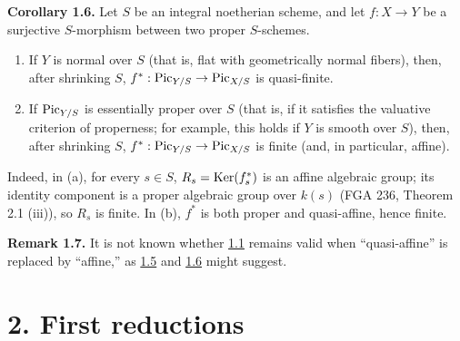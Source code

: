 \textbf{Corollary 1.6.} Let $S$ be an integral noetherian scheme, and let
$f:X\to Y$ be a surjective $S$-morphism between two proper $S$-schemes.
\begin{enumerate}[label=\alph*)]
\item If $Y$ is normal over $S$ (that is, flat with geometrically normal
  fibers), then, after shrinking $S$,
  $f^*:\operatorname{Pic}_{Y/S}\to\operatorname{Pic}_{X/S}$ is quasi-finite.
\item If $\operatorname{Pic}_{Y/S}$ is essentially proper over $S$ (that is, if it
  satisfies the valuative criterion of properness; for example, this holds
  if $Y$ is smooth over $S$), then, after shrinking $S$,
  $f^*:\operatorname{Pic}_{Y/S}\to\operatorname{Pic}_{X/S}$ is finite (and, in particular, affine).
\end{enumerate}
Indeed, in (a), for every $s\in S$, $R_s=\operatorname{Ker}(f_s^*)$ is an affine algebraic
group; its identity component is a proper algebraic group over $k(s)$
(FGA 236, Theorem 2.1 (iii)), so $R_s$ is finite. In (b), $f^*$ is both
proper and quasi-affine, hence finite.

\textbf{Remark 1.7.} It is not known whether \hyperlink{sga6.e12.thm.1-1}{1.1} remains valid when
``quasi-affine'' is replaced by ``affine,'' as \hyperlink{sga6.e12.cor.1-5}{1.5} and \hyperlink{sga6.e12.cor.1-6}{1.6} might suggest.

\section*{2. First reductions}


